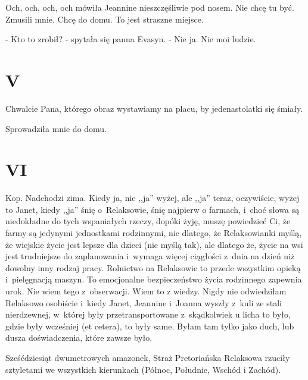 \documentclass[oneside,polish,12pt,sfheadings]{mwbk}
\begin{document}
Och, och, och, och mówiła Jeannine nieszczęśliwie pod nosem. Nie chcę
tu być. Zmusili mnie. Chcę do domu. To jest straszne miejsce.

- Kto to zrobił? - spytała się panna Evasyn. - Nie ja. Nie moi ludzie.

\chapter{V}

Chwalcie Pana, którego obraz wystawiamy na placu, by jedenastolatki
się śmiały.

Sprowadziła mnie do domu.

\chapter{VI}

Kop. Nadchodzi zima. Kiedy ja, nie ,,ja'' wyżej, ale ,,ja'' teraz,
oczywiście, wyżej to Janet, kiedy ,,ja'' śnię o~Relaksowie, śnię najpierw
o farmach, i~choć słowa są niedokładne do tych wspaniałych rzeczy,
dopóki żyję, muszę powiedzieć Ci, że farmy są jedynymi jednostkami
rodzinnymi, nie dlatego, że Relaksowianki myślą, że wiejskie życie
jest lepsze dla dzieci (nie myślą tak), ale dlatego że, życie na wsi
jest trudniejsze do zaplanowania i~wymaga więcej ciągłości z~dnia
na dzień niż dowolny inny rodzaj pracy. Rolnictwo na Relaksowie to
przede wszystkim opieką i~pielęgnacją maszyn. To emocjonalne bezpieczeństwo
życia rodzinnego zapewnia urok. Nie wiem tego z~obserwacji. Wiem to
z wiedzy. Nigdy nie odwiedziłam Relaksowo osobiście i~kiedy Janet,
Jeannine i~Joanna wyszły z~kuli ze stali nierdzewnej, w~której były
przetransportowane z~skądkolwiek u licha to było, gdzie były wcześniej
(et cetera), to były same. Byłam tam tylko jako duch, lub dusza doświadczenia,
które zawsze było.

Sześćdziesiąt dwumetrowych amazonek, Straż Pretoriańska Relaksowa
rzuciły sztyletami we wszystkich kierunkach (Północ, Południe, Wschód
i Zachód).
\end{document}
